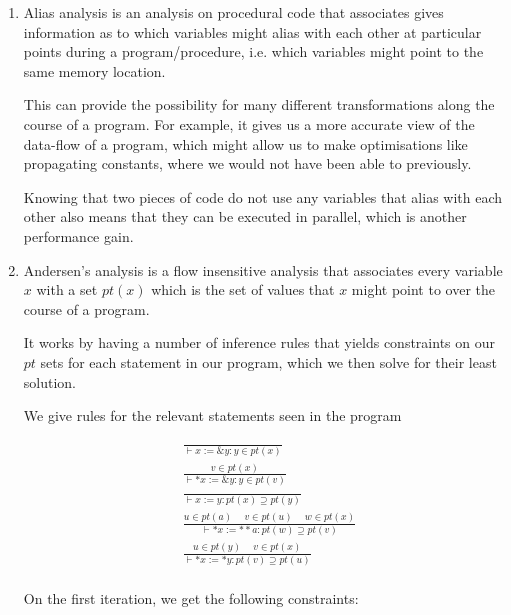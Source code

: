 


\begin{enumerate}[label=(\alph*)]

  \item
    Alias analysis is an analysis on procedural code that associates gives information as to which variables might alias with each other at particular points during a program/procedure, i.e. which variables might point to the same memory location.

    This can provide the possibility for many different transformations along the course of a program. For example, it gives us a more accurate view of the data-flow of a program, which might allow us to make optimisations like propagating constants, where we would not have been able to previously.

    Knowing that two pieces of code do not use any variables that alias with each other also means that they can be executed in parallel, which is another performance gain.

    \item
      Andersen's analysis is a flow insensitive analysis that associates every variable $x$ with a set $pt(x)$ which is the set of values that $x$ might point to over the course of a program.

      It works by having a number of inference rules that yields constraints on our $pt$ sets for each statement in our program, which we then solve for their least solution.

      We give rules for the relevant statements seen in the program

      \begin{align*}
        &\frac{}{\vdash  x := \&y : y \in pt(x)}\\
        &\frac{v \in pt(x)}{\vdash *x := \&y : y \in pt(v)}\\
        &\frac{}{\vdash x := y : pt(x) \supseteq pt(y)}\\
        &\frac{u \in pt(a) \hspace{15pt} v \in pt(u) \hspace{15pt} w \in pt(x)}{\vdash *x := **a : pt(w) \supseteq pt(v)}\\
        &\frac{u \in pt(y) \hspace{15pt} v \in pt(x)}{\vdash *x := *y : pt(v) \supseteq pt(u)}\\
      \end{align*}

      On the first iteration, we get the following constraints:


\end{enumerate}

